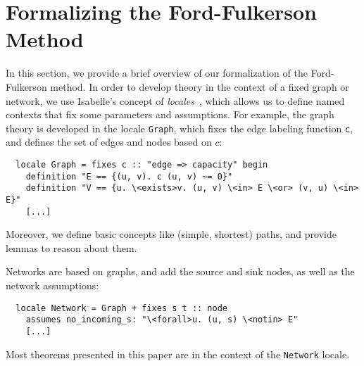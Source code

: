 \documentclass{llncs}
\newcommand{\isai}{\lstinline[language=isabelle,basicstyle=\normalsize\ttfamily\slshape]}
\begin{document}
\section{Formalizing the Ford-Fulkerson Method}\label{sec:abs-formalization}
%
%    
%      
%    
%    


In this section, we provide a brief overview of our formalization of the Ford-Fulkerson method. 
In order to develop theory in the context of a fixed graph or network, we use Isabelle's concept of \emph{locales}~\cite{Ballarin:2006:MKM}, which allows
us to define named contexts that fix some parameters and assumptions.
For example, the graph theory is developed in the locale \isai{Graph}, which 
fixes the edge labeling function \isai{c}, and defines the set of edges and nodes based on $c$:
\begin{lstlisting}
  locale Graph = fixes c :: "edge => capacity" begin
    definition "E == {(u, v). c (u, v) ~= 0}"
    definition "V == {u. \<exists>v. (u, v) \<in> E \<or> (v, u) \<in> E}"
    [...]
\end{lstlisting}
Moreover, we define basic concepts like (simple, shortest) paths, and provide lemmas to reason about them.

Networks are based on graphs, and add the source and sink nodes, as well as the network assumptions:
\begin{lstlisting}
  locale Network = Graph + fixes s t :: node
    assumes no_incoming_s: "\<forall>u. (u, s) \<notin> E"
    [...]
\end{lstlisting}
Most theorems presented in this paper are in the context of the \isai{Network} locale.
\end{document}
